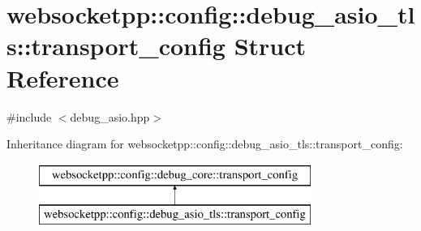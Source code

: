 \hypertarget{structwebsocketpp_1_1config_1_1debug__asio__tls_1_1transport__config}{}\section{websocketpp\+:\+:config\+:\+:debug\+\_\+asio\+\_\+tls\+:\+:transport\+\_\+config Struct Reference}
\label{structwebsocketpp_1_1config_1_1debug__asio__tls_1_1transport__config}


{\ttfamily \#include $<$debug\+\_\+asio.\+hpp$>$}

Inheritance diagram for websocketpp\+:\+:config\+:\+:debug\+\_\+asio\+\_\+tls\+:\+:transport\+\_\+config\+:\begin{figure}[H]
\begin{center}
\leavevmode
\includegraphics[height=2.000000cm]{structwebsocketpp_1_1config_1_1debug__asio__tls_1_1transport__config}
\end{center}
\end{figure}
